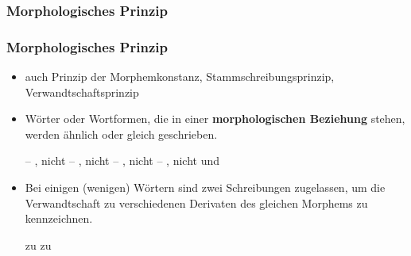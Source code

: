 \subsubsection{Morphologisches Prinzip}

\begin{frame}
\frametitle{Morphologisches Prinzip}

\begin{itemize}
	\item auch Prinzip der Morphemkonstanz, Stammschreibungsprinzip, Verwandtschaftsprinzip
	
	\item Wörter oder Wortformen, die in einer \textbf{morphologischen Beziehung} stehen, werden ähnlich oder gleich geschrieben.
	
	\eal
	\ex {} -- , nicht 
	\ex {} -- , nicht 
	\ex {} -- , nicht 
	\ex {} -- , nicht  und 
	\zl

	\item Bei einigen (wenigen) Wörtern sind zwei Schreibungen zugelassen, um die Verwandtschaft zu verschiedenen Derivaten des gleichen Morphems zu kennzeichnen.
	
	\ea 
	\ea {} zu 
	\ex {} zu 
	\z
	\z 
\end{itemize}

\end{frame}


